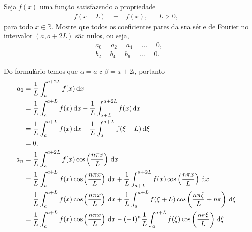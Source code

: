 \documentclass[a4paper,12pt, leqno, answers]{exam}
\begin{document}
\begin{questions}

    \question[P1 de 2006] Seja $f(x)$ uma fun\c{c}\~{a}o satisfazendo a propriedade
    \begin{align*}
        f(x + L) &= -f(x), && L > 0,
    \end{align*}
    para todo $x \in \mathbb{R}$. Mostre que todos os coeficientes pares da sua s\'{e}rie de Fourier no intervalor $(a, a + 2 L)$ s\~{a}o nulos, ou seja,
    \begin{align*}
        & a_0 = a_2 = a_4 = \ldots = 0, \\
        & b_2 = b_4 = b_6 = \ldots = 0.
    \end{align*}
    \begin{solution}
        Do formul\'{a}rio temos que $\alpha = a$ e $\beta = a + 2 l$, portanto
        \begin{align*}
            a_0 &= \frac{1}{L} \int_a^{a + 2 L} f(x) \id{x} \\
            &= \frac{1}{L} \int_a^{a + L} f(x) \id{x} + \frac{1}{L} \int_{a + L}^{a + 2 L} f(x) \id{x} \\
            &= \frac{1}{L} \int_a^{a + L} f(x) \id{x} + \frac{1}{L} \int_a^{a + L} f(\xi + L) \id{\xi} \\
            &= 0, \\
            a_n &= \frac{1}{L} \int_a^{a + 2 L} f(x) \cos\left( \frac{n \pi x}{L} \right) \id{x} \\
            &= \frac{1}{L} \int_a^{a + L} f(x) \cos\left( \frac{n \pi x}{L} \right) \id{x} + \frac{1}{L} \int_{a + L}^{a + 2 L} f(x) \cos\left( \frac{n \pi x}{L} \right) \id{x} \\
            &= \frac{1}{L} \int_a^{a + L} f(x) \cos\left( \frac{n \pi x}{L} \right) \id{x} + \frac{1}{L} \int_a^{a + L} f(\xi + L) \cos\left( \frac{n \pi \xi}{L} + n \pi \right) \id{\xi} \\
            &= \frac{1}{L} \int_a^{a + L} f(x) \cos\left( \frac{n \pi x}{L} \right) \id{x} - (-1)^n \frac{1}{L} \int_a^{a + L} f(\xi) \cos\left( \frac{n \pi \xi}{L} \right) \id{\xi} \\

\end{align*}
\end{solution}
\end{questions}
\end{document}

